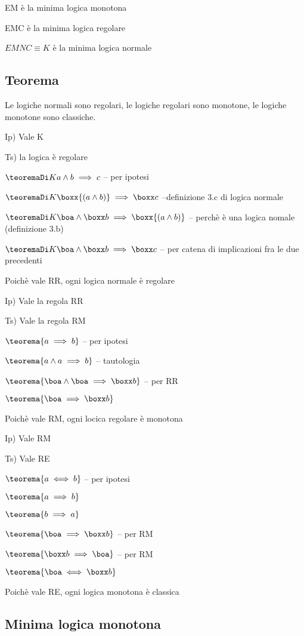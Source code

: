 EM è la minima logica monotona

EMC è la minima logica regolare

$EMNC\equiv K$ è la minima logica normale


\subsection*{Teorema}

Le logiche normali sono regolari, le logiche regolari sono monotone,
le logiche monotone sono classiche.

Ip) Vale K

Ts) la logica è regolare

$\teoremaDi Ka\wedge b\implies c$ -- per ipotesi

$\teoremaDi K\boxx{(a\wedge b)}\implies\boxx c$ --definizione 3.c
di logica normale

$\teoremaDi K\boa\wedge\boxx b\implies\boxx{(a\wedge b)}$ -- perchè
è una logica nomale (definizione 3.b)

$\teoremaDi K\boa\wedge\boxx b\implies\boxx c$ -- per catena di implicazioni
fra le due precedenti

Poichè vale RR, ogni logica normale è regolare

Ip) Vale la regola RR

Ts) Vale la regola RM

$\teorema{a\implies b}$ -- per ipotesi

$\teorema{a\wedge a\implies b}$ -- tautologia

$\teorema{\boa\wedge\boa\implies\boxx b}$ -- per RR

$\teorema{\boa\implies\boxx b}$ 

Poichè vale RM, ogni locica regolare è monotona

Ip) Vale RM

Ts) Vale RE

$\teorema{a\iff b}$ -- per ipotesi

$\teorema{a\implies b}$

$\teorema{b\implies a}$

$\teorema{\boa\implies\boxx b}$ -- per RM

$\teorema{\boxx b\implies\boa}$ -- per RM

$\teorema{\boa\iff\boxx b}$

Poichè vale RE, ogni logica monotona è classica


\subsection{Minima logica monotona}

